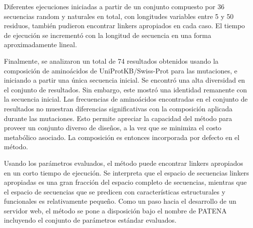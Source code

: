 Diferentes ejecuciones iniciadas a partir de un conjunto compuesto por 36 secuencias random y naturales en total, 
con longitudes variables entre 5 y 50 residuos, también pudieron encontrar linkers apropiados en cada caso.
El tiempo de ejecución se incrementó con la longitud de secuencia en una forma aproximadamente lineal.




Finalmente, se analizaron un total de 74 resultados obtenidos usando la composición de aminoácidos de UniProtKB/Swiss-Prot para las mutaciones, e iniciando a partir una única secuencia inicial.
Se encontró una alta diversidad en el conjunto de resultados. Sin embargo, este mostró una identidad remanente con la secuencia inicial.
Las frecuencias de aminoácidos encontradas en el conjunto de resultados no muestran diferencias significativas con la composición aplicada durante las mutaciones.
Esto permite apreciar la capacidad del método para proveer un conjunto diverso de diseños, a la vez que se minimiza el costo metabólico asociado.
La composición es entonces incorporada por defecto en el método.




Usando los parámetros evaluados, el método puede encontrar linkers apropiados en un corto tiempo de ejecución.
Se interpreta que el espacio de secuencias linkers apropiadas es una gran fracción del espacio completo de secuencias, 
mientras que el espacio de secuencias que se predicen con características estructurales y funcionales es relativamente pequeño.
Como un paso hacia el desarrollo de un servidor web, el método se pone a disposición bajo el nombre de PATENA incluyendo el conjunto de parámetros estándar evaluados.